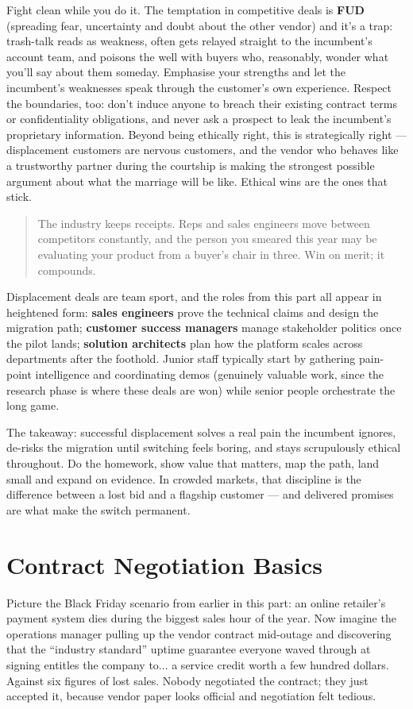 Fight clean while you do it. The temptation in competitive deals is \textbf{FUD} (spreading fear, uncertainty and doubt about the other vendor) and it's a trap: trash-talk reads as weakness, often gets relayed straight to the incumbent's account team, and poisons the well with buyers who, reasonably, wonder what you'll say about them someday. Emphasise your strengths and let the incumbent's weaknesses speak through the customer's own experience. Respect the boundaries, too: don't induce anyone to breach their existing contract terms or confidentiality obligations, and never ask a prospect to leak the incumbent's proprietary information. Beyond being ethically right, this is strategically right — displacement customers are nervous customers, and the vendor who behaves like a trustworthy partner during the courtship is making the strongest possible argument about what the marriage will be like. Ethical wins are the ones that stick.



\begin{quote}\small
The industry keeps receipts. Reps and sales engineers move between competitors constantly, and the person you smeared this year may be evaluating your product from a buyer's chair in three. Win on merit; it compounds.
\end{quote}


Displacement deals are team sport, and the roles from this part all appear in heightened form: \textbf{sales engineers} prove the technical claims and design the migration path; \textbf{customer success managers} manage stakeholder politics once the pilot lands; \textbf{solution architects} plan how the platform scales across departments after the foothold. Junior staff typically start by gathering pain-point intelligence and coordinating demos (genuinely valuable work, since the research phase is where these deals are won) while senior people orchestrate the long game.


The takeaway: successful displacement solves a real pain the incumbent ignores, de-risks the migration until switching feels boring, and stays scrupulously ethical throughout. Do the homework, show value that matters, map the path, land small and expand on evidence. In crowded markets, that discipline is the difference between a lost bid and a flagship customer — and delivered promises are what make the switch permanent.

\section{Contract Negotiation Basics}
Picture the Black Friday scenario from earlier in this part: an online retailer's payment system dies during the biggest sales hour of the year. Now imagine the operations manager pulling up the vendor contract mid-outage and discovering that the ``industry standard'' uptime guarantee everyone waved through at signing entitles the company to... a service credit worth a few hundred dollars. Against six figures of lost sales. Nobody negotiated the contract; they just accepted it, because vendor paper looks official and negotiation felt tedious.



